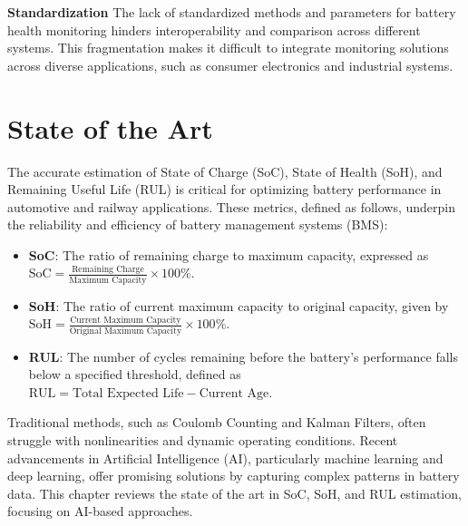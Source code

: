 \textbf{Standardization}
The lack of standardized methods and parameters for battery health monitoring hinders interoperability and comparison across different systems. 
This fragmentation makes it difficult to integrate monitoring solutions across diverse applications, such as consumer electronics and industrial systems.






\chapter{State of the Art}
\label{ch:stateoftheart}
The accurate estimation of State of Charge (SoC), State of Health (SoH), and Remaining Useful Life (RUL) is critical for optimizing battery performance in automotive and railway applications. These metrics, defined as follows, underpin the reliability and efficiency of battery management systems (BMS):
\begin{itemize}
    \item \textbf{SoC}: The ratio of remaining charge to maximum capacity, expressed as \( \text{SoC} = \frac{\text{Remaining Charge}}{\text{Maximum Capacity}} \times 100\% \).
    \item \textbf{SoH}: The ratio of current maximum capacity to original capacity, given by \( \text{SoH} = \frac{\text{Current Maximum Capacity}}{\text{Original Maximum Capacity}} \times 100\% \).
    \item \textbf{RUL}: The number of cycles remaining before the battery's performance falls below a specified threshold, defined as \( \text{RUL} = \text{Total Expected Life} - \text{Current Age} \).
\end{itemize}
Traditional methods, such as Coulomb Counting and Kalman Filters, often struggle with nonlinearities and dynamic operating conditions. Recent advancements in Artificial Intelligence (AI), particularly machine learning and deep learning, offer promising solutions by capturing complex patterns in battery data. This chapter reviews the state of the art in SoC, SoH, and RUL estimation, focusing on AI-based approaches.

